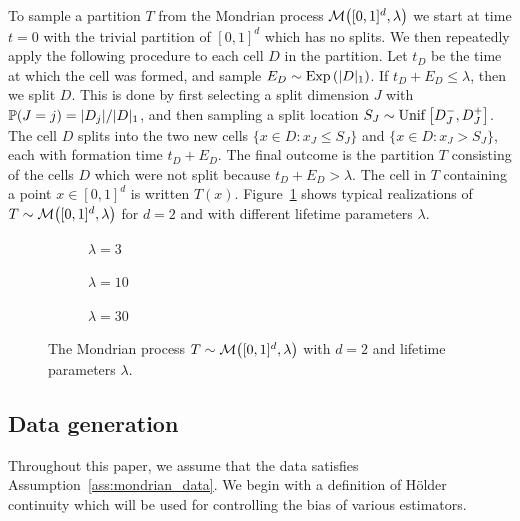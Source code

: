 To sample a partition $T$ from the Mondrian process
$\cM \big( [0,1]^d, \lambda \big)$
we start at time $t=0$ with the trivial partition
of $[0,1]^d$ which has no splits.
We then repeatedly apply the following procedure to each cell $D$
in the partition.
Let $t_D$ be the time at which the cell was formed,
and sample $E_D \sim \Exp \left( |D|_1 \right)$.
If $t_D + E_D \leq \lambda$, then we split $D$.
This is done by first selecting a split dimension $J$ with
$\P(J=j) = |D_j| / |D|_1$, and then sampling a split location
$S_J \sim \Unif\big[D_J^-, D_J^+\big]$.
The cell $D$ splits into the two new cells
$\{x \in D : x_J \leq S_J\}$ and $\{x \in D : x_J > S_J\}$,
each with formation time $t_D + E_D$.
The final outcome is the partition $T$ consisting of the cells $D$
which were not split because $t_D + E_D > \lambda$.
The cell in $T$ containing a point $x \in [0,1]^d$
is written $T(x)$.
Figure~\ref{fig:mondrian_process} shows typical realizations of
$T \sim \cM\big( [0,1]^d, \lambda \big)$ for
$d=2$ and with different lifetime parameters $\lambda$.
%
\begin{figure}[ht]
  \centering
  \begin{subfigure}{0.32\textwidth}
    \centering
    \resizebox{1.0\textwidth}{!}{
      
    }
    \caption{$\lambda = 3$}
  \end{subfigure}
  \begin{subfigure}{0.32\textwidth}
    \centering
    \resizebox{1.0\textwidth}{!}{
      
    }
    \caption{$\lambda = 10$}
  \end{subfigure}
  \begin{subfigure}{0.32\textwidth}
    \centering
    \resizebox{1.0\textwidth}{!}{
      
    }
    \caption{$\lambda = 30$}
  \end{subfigure}
  \caption{
    The Mondrian process
    $T \sim \cM \big( [0,1]^d, \lambda \big)$
    with $d=2$ and lifetime parameters $\lambda$.
  }
  \label{fig:mondrian_process}
\end{figure}

\subsection{Data generation}

Throughout this paper,
we assume that the data satisfies Assumption~\ref{ass:mondrian_data}.
We begin with a definition of H{\"o}lder continuity
which will be used for controlling the bias of various estimators.

